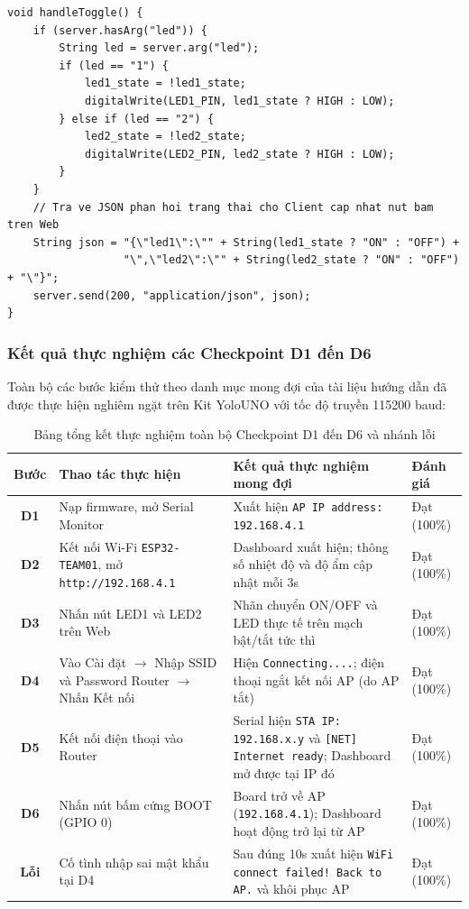 \begin{lstlisting}[caption={Hiện thực hoàn chỉnh hàm handleToggle() điều khiển LED}]
void handleToggle() {
    if (server.hasArg("led")) {
        String led = server.arg("led");
        if (led == "1") {
            led1_state = !led1_state;
            digitalWrite(LED1_PIN, led1_state ? HIGH : LOW);
        } else if (led == "2") {
            led2_state = !led2_state;
            digitalWrite(LED2_PIN, led2_state ? HIGH : LOW);
        }
    }
    // Tra ve JSON phan hoi trang thai cho Client cap nhat nut bam tren Web
    String json = "{\"led1\":\"" + String(led1_state ? "ON" : "OFF") + 
                  "\",\"led2\":\"" + String(led2_state ? "ON" : "OFF") + "\"}";
    server.send(200, "application/json", json);
}
\end{lstlisting}

\subsubsection{Kết quả thực nghiệm các Checkpoint D1 đến D6}
Toàn bộ các bước kiểm thử theo danh mục mong đợi của tài liệu hướng dẫn đã được thực hiện nghiêm ngặt trên Kit YoloUNO với tốc độ truyền 115200 baud:

\begin{table}[H]
\centering
\begin{tabularx}{\textwidth}{|>{\bfseries}c|m{4.8cm}|m{5.2cm}|>{\centering\arraybackslash}X|}
\hline
\rowcolor{codeframe!40}
\textbf{Bước} & \textbf{Thao tác thực hiện} & \textbf{Kết quả thực nghiệm mong đợi} & \textbf{Đánh giá} \\
\hline
D1 & Nạp firmware, mở Serial Monitor & Xuất hiện \texttt{AP IP address: 192.168.4.1} & Đạt (100\%) \\
\hline
D2 & Kết nối Wi-Fi \texttt{ESP32-TEAM01}, mở \texttt{http://192.168.4.1} & Dashboard xuất hiện; thông số nhiệt độ và độ ẩm cập nhật mỗi 3s & Đạt (100\%) \\
\hline
D3 & Nhấn nút LED1 và LED2 trên Web & Nhãn chuyển ON/OFF và LED thực tế trên mạch bật/tắt tức thì & Đạt (100\%) \\
\hline
D4 & Vào Cài đặt $\to$ Nhập SSID và Password Router $\to$ Nhấn Kết nối & Hiện \texttt{Connecting....}; điện thoại ngắt kết nối AP (do AP tắt) & Đạt (100\%) \\
\hline
D5 & Kết nối điện thoại vào Router & Serial hiện \texttt{STA IP: 192.168.x.y} và \texttt{[NET] Internet ready}; Dashboard mở được tại IP đó & Đạt (100\%) \\
\hline
D6 & Nhấn nút bấm cứng BOOT (GPIO 0) & Board trở về AP (\texttt{192.168.4.1}); Dashboard hoạt động trở lại từ AP & Đạt (100\%) \\
\hline
Lỗi & Cố tình nhập sai mật khẩu tại D4 & Sau đúng 10s xuất hiện \texttt{WiFi connect failed! Back to AP.} và khôi phục AP & Đạt (100\%) \\
\hline
\end{tabularx}
\caption{Bảng tổng kết thực nghiệm toàn bộ Checkpoint D1 đến D6 và nhánh lỗi}
\label{tab:checkpoints-d1-d6}
\end{table}

